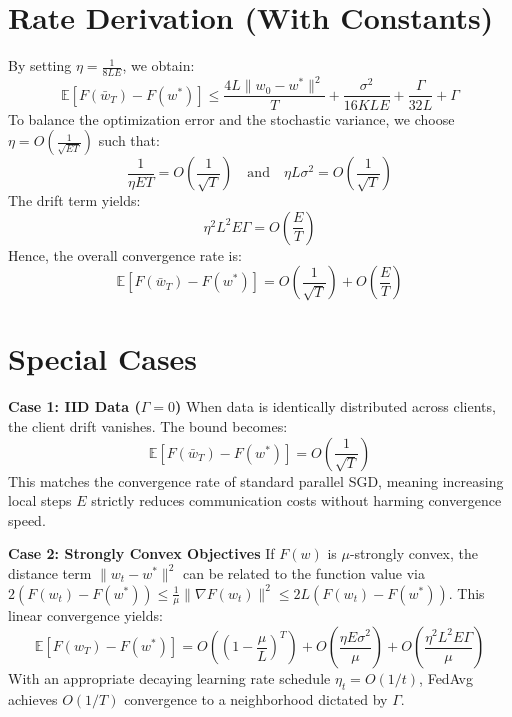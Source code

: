 \documentclass{article}
\begin{document}
\section*{Rate Derivation (With Constants)}
By setting $\eta = \frac{1}{8LE}$, we obtain:
$$ \mathbb{E}[F(\bar{w}_T) - F(w^*)] \leq \frac{4L\|w_0 - w^*\|^2}{T} + \frac{\sigma^2}{16KLE} + \frac{\Gamma}{32L} + \Gamma $$
To balance the optimization error and the stochastic variance, we choose $\eta = O\left(\frac{1}{\sqrt{ET}}\right)$ such that:
$$ \frac{1}{\eta ET} = O\left(\frac{1}{\sqrt{T}}\right) \quad \text{and} \quad \eta L \sigma^2 = O\left(\frac{1}{\sqrt{T}}\right) $$
The drift term yields:
$$ \eta^2 L^2 E \Gamma = O\left(\frac{E}{T}\right) $$
Hence, the overall convergence rate is:
$$ \mathbb{E}[F(\bar{w}_T) - F(w^*)] = O\left(\frac{1}{\sqrt{T}}\right) + O\left(\frac{E}{T}\right) $$

\section*{Special Cases}
\textbf{Case 1: IID Data ($\Gamma = 0$)}
When data is identically distributed across clients, the client drift vanishes. The bound becomes:
$$ \mathbb{E}[F(\bar{w}_T) - F(w^*)] = O\left(\frac{1}{\sqrt{T}}\right) $$
This matches the convergence rate of standard parallel SGD, meaning increasing local steps $E$ strictly reduces communication costs without harming convergence speed.

\textbf{Case 2: Strongly Convex Objectives}
If $F(w)$ is $\mu$-strongly convex, the distance term $\|w_t - w^*\|^2$ can be related to the function value via $2(F(w_t) - F(w^*)) \leq \frac{1}{\mu}\|\nabla F(w_t)\|^2 \leq 2L(F(w_t) - F(w^*))$. This linear convergence yields:
$$ \mathbb{E}[F(w_T) - F(w^*)] = O\left( \left(1 - \frac{\mu}{L}\right)^T \right) + O\left(\frac{\eta E \sigma^2}{\mu}\right) + O\left(\frac{\eta^2 L^2 E \Gamma}{\mu}\right) $$
With an appropriate decaying learning rate schedule $\eta_t = O(1/t)$, FedAvg achieves $O(1/T)$ convergence to a neighborhood dictated by $\Gamma$.
\end{document}
